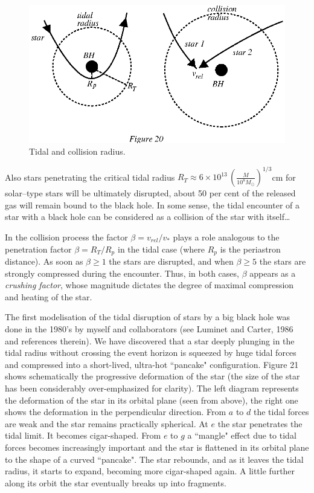 \documentclass[12pt]{article}
\begin{document}
\begin{figure}[tb]
  \begin{center}
    \leavevmode
    \includegraphics{disrup.ps}
    \caption{Tidal and collision radius.}
  \end{center}
\end{figure}
Also stars penetrating the critical tidal radius
$R_{T} \approx 6\times
 10^{13} \, ( \frac{M}{10^{8}M_{\odot}} )^{1/3}$cm for solar--type 
stars will be ultimately disrupted, about 50 per cent of the released gas 
will remain bound to the black hole. In some sense, the tidal encounter 
of a star with a black hole can be considered as a collision of the 
star with itself\ldots 

In the collision process the factor $\beta = v_{rel}/v_{*}$ plays a 
role analogous to the penetration factor $\beta = 
R_{T}/R_{p}$ in the tidal case (where $R_{p}$ is the 
periastron distance). As soon 
as $\beta \geq 1$ the stars are disrupted, and when $\beta \geq 5$ the 
stars are strongly compressed during the encounter. Thus, in both cases,
$\beta$ appears 
as a {\it crushing factor}, whose magnitude dictates the degree of maximal
compression and heating of the star. 

The first modelisation of the tidal disruption of stars by a big 
black hole was done in the 1980's by myself and collaborators 
(see Luminet and Carter, 1986 and references therein). 
We have discovered that a star deeply 
plunging in the tidal radius without crossing the event horizon is 
squeezed by huge tidal forces and compressed into a short-lived, 
ultra-hot ``pancake" 
configuration. Figure 21 shows schematically the progressive 
deformation of the star (the size of the star has been considerably 
over-emphasized for clarity). The left diagram represents the deformation 
of the star in its orbital plane (seen from above), the right one shows 
the deformation in the perpendicular direction. From $a$ to $d$ the 
tidal forces are weak and the star remains practically spherical. At 
$e$ the 
star penetrates the tidal limit. It becomes cigar-shaped. From $e$ 
to $g$ a ``mangle" effect due to tidal forces becomes increasingly important and the 
star is flattened in its orbital plane to the shape of a curved 
``pancake". The star rebounds, and as it leaves the tidal radius, it 
starts to expand, becoming more cigar-shaped again. A little further 
along its orbit the star eventually breaks up into fragments.
\end{document}
